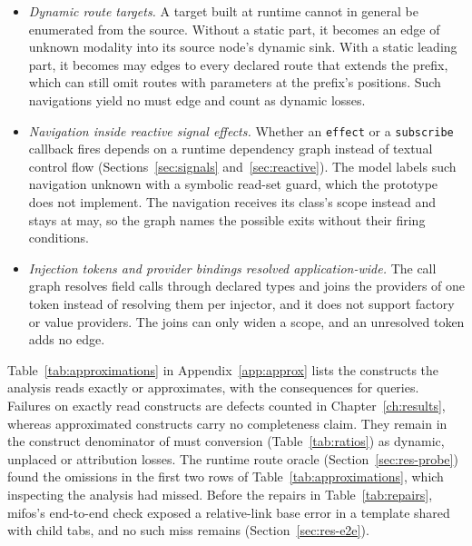 \begin{itemize}
\item \emph{Dynamic route targets.} A target built at runtime cannot in general be enumerated from
the source. Without a static part, it becomes an edge of unknown modality into its source node's
dynamic sink. With a static leading part, it becomes may edges to every declared route that extends
the prefix, which can still omit routes with parameters at the prefix's positions. Such navigations
yield no must edge and count as dynamic losses.
\item \emph{Navigation inside reactive signal effects.} Whether an \texttt{effect} or a
\texttt{subscribe} callback fires depends on a runtime dependency graph instead of textual control
flow (Sections~\ref{sec:signals} and~\ref{sec:reactive}). The model labels such navigation unknown
with a symbolic read-set guard, which the prototype does not implement. The navigation receives its
class's scope instead and stays at may, so the graph names the possible exits without their firing
conditions.
\item \emph{Injection tokens and provider bindings resolved application-wide.} The call graph
resolves field calls through declared types and joins the providers of one token instead of
resolving them per injector, and it does not support factory or value providers. The joins can only
widen a scope, and an unresolved token adds no edge.
\end{itemize}

Table~\ref{tab:approximations} in Appendix~\ref{app:approx} lists the constructs the analysis
reads exactly or approximates, with the consequences for queries. Failures on exactly read
constructs are defects counted in Chapter~\ref{ch:results}, whereas approximated constructs carry
no completeness claim. They remain in the construct denominator of must conversion
(Table~\ref{tab:ratios}) as dynamic, unplaced or attribution losses. The runtime route oracle
(Section~\ref{sec:res-probe}) found the omissions in the first two rows of
Table~\ref{tab:approximations}, which inspecting the analysis had missed. Before the repairs in
Table~\ref{tab:repairs}, mifos's end-to-end check exposed a relative-link base error in a template
shared with child tabs, and no such miss remains (Section~\ref{sec:res-e2e}).

